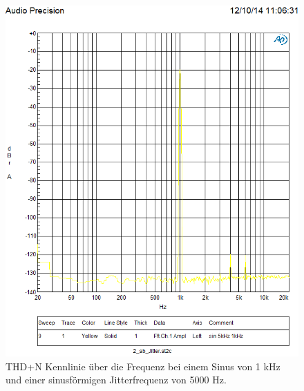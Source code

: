 \begin{figure}[h!]
\centering
\includegraphics[width=\columnwidth]{figures/Aufg2/9.PNG} 
\caption{THD+N Kennlinie über die Frequenz bei einem Sinus von 1 kHz und einer sinusförmigen Jitterfrequenz von 5000 Hz.}
\label{fig:3}
\end{figure}


